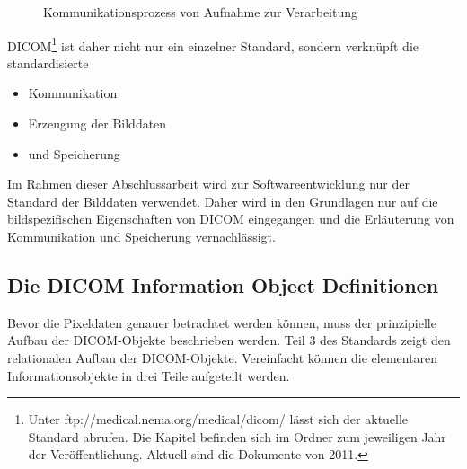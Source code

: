 \begin{figure}[htbp]
  \vspace{0.5cm}
  \centering
  \caption{Kommunikationsprozess von Aufnahme zur Verarbeitung \cite[S. 19]{pianykh:dicom}}
  \label{communication}
  \vspace{0.5cm}
\end{figure}

DICOM\footnote{Unter ftp://medical.nema.org/medical/dicom/ lässt sich der aktuelle Standard abrufen. Die Kapitel befinden sich im Ordner zum jeweiligen Jahr der Veröffentlichung. Aktuell sind die Dokumente von 2011.} ist daher nicht nur ein einzelner Standard, sondern verknüpft die standardisierte 
\begin{itemize}
\item Kommunikation
\item Erzeugung der Bilddaten
\item und Speicherung
\end{itemize}
Im Rahmen dieser Abschlussarbeit wird zur Softwareentwicklung nur der Standard der Bilddaten verwendet. Daher wird in den Grundlagen nur auf die bildspezifischen Eigenschaften von DICOM eingegangen und die Erläuterung von Kommunikation und Speicherung vernachlässigt.

\subsection{Die DICOM Information Object Definitionen} \label{grundlagen:iod}
Bevor die Pixeldaten genauer betrachtet werden können, muss der prinzipielle Aufbau der DICOM-Objekte beschrieben werden. Teil 3 des Standards\cite[A.1.2]{dicom:iod} zeigt den relationalen Aufbau der DICOM-Objekte. Vereinfacht können die elementaren Informationsobjekte in drei Teile aufgeteilt werden.

